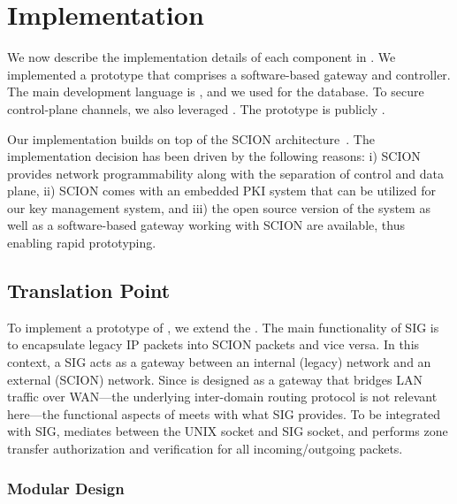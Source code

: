\chapter{Implementation}
\label{impl}


We now describe the implementation details of each component in \name.
We implemented a prototype that comprises a software-based gateway and controller.
The main development language is , and we used  for the database. To secure control-plane channels, we also leveraged
. The prototype is publicly .

Our implementation builds on top of the SCION architecture~\cite{Perrig2017}.
The implementation decision has been driven by the following reasons: i) SCION provides
network programmability along with the separation of control and data plane, ii) SCION comes
with an embedded PKI system that can be utilized for our key management system, and
iii) the open source version of the  system as well as a
software-based gateway working with SCION are available, thus enabling rapid prototyping.


\section{Translation Point}
\label{sec:tp}

To implement a prototype of \tp, we extend the .
The main functionality of SIG is to encapsulate legacy IP packets into SCION packets and
vice versa. In this context, a SIG acts as a gateway between an internal (legacy) network
and an external (SCION) network. Since \tp is designed as a gateway that bridges LAN
traffic over WAN---the underlying inter-domain routing protocol is not relevant here---the
functional aspects of \tp meets with what SIG provides. To be integrated with SIG, \tp
mediates between the UNIX socket and SIG socket, and performs zone transfer authorization
and verification for all incoming/outgoing packets.

\subsection{Modular Design}
\label{ssec:mod_design}

